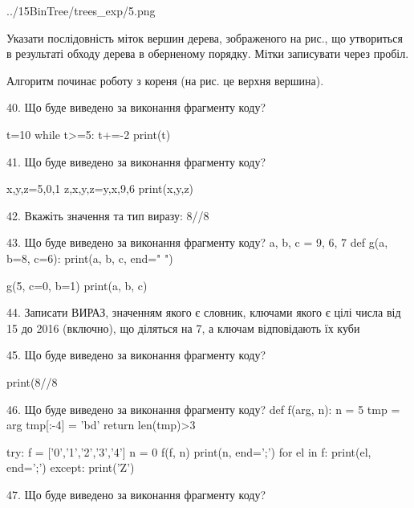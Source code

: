 \documentclass[11pt]{article}
\begin{document}
\begin{center}
	{../15BinTree/trees_exp/5.png}
\end{center}
Указати послідовність міток вершин дерева, зображеного на рис., що утвориться в результаті обходу дерева в оберненому порядку. Мітки записувати через пробіл.\par Алгоритм починає роботу з кореня (на рис. це верхня вершина).
\vspace{5mm}

40. Що буде виведено за виконання фрагменту коду?

t=10
while t>=5:
    t+=-2
print(t)

\vspace{5mm}

41. Що буде виведено за виконання фрагменту коду?

x,y,z=5,0,1
z,x,y,z=y,x,9,6
print(x,y,z)
\vspace{5mm}

42. 
Вкажіть значення та тип виразу:
8//8%
\vspace{5mm}

43. Що буде виведено за виконання фрагменту коду?
a, b, c = 9, 6, 7
def g(a, b=8, c=6):
    print(a, b, c, end=" ")

g(5, c=0, b=1)
print(a, b, c)
\vspace{5mm}

44. 
Записати ВИРАЗ, значенням якого є словник, ключами якого є цілі числа від 15 до 2016 (включно), що діляться на 7, а ключам відповідають їх куби \vspace{5mm}

45. Що буде виведено за виконання фрагменту коду?

print(8//8%
\vspace{5mm}

46. Що буде виведено за виконання фрагменту коду?
def f(arg, n):
    n = 5
    tmp = arg
    tmp[:-4] = 'bd'
    return len(tmp)>3

try:
    f = ['0','1','2','3','4']
    n = 0
    f(f, n)
    print(n, end=';')
    for el in f:
        print(el, end=';')
except:
    print('Z')
\vspace{5mm}

47. Що буде виведено за виконання фрагменту коду?
\end{document}
